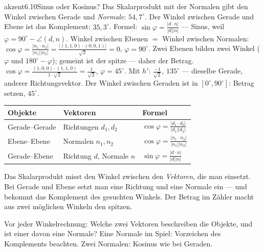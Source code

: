 \begin{loesungkarte}{akzent}{6.10}{Sinus oder Kosinus?}
Das Skalarprodukt mit der Normalen gibt den Winkel zwischen Gerade und \emph{Normale}: $54{,}7^{\circ}$. Der Winkel zwischen Gerade und Ebene ist das Komplement: $35{,}3^{\circ}$. Formel: $\sin\varphi = \frac{|d\cdot n|}{|d||n|}$ --- Sinus, weil $\varphi = 90^{\circ} - \angle(d, n)$.
Winkel zwischen Ebenen $=$ Winkel zwischen Normalen: $\cos\varphi = \frac{|n_1\cdot n_2|}{|n_1||n_2|} = \frac{|(1, 1, 0)\cdot(0, 0, 1)|}{\sqrt2} = 0$, $\varphi = 90^{\circ}$. Zwei Ebenen bilden zwei Winkel ($\varphi$ und $180^{\circ} - \varphi$); gemeint ist der spitze --- daher der Betrag.
$\cos\varphi = \frac{(1, 0, 0)\cdot(1, 1, 0)}{1\cdot\sqrt2} = \frac1{\sqrt2}$, $\varphi = 45^{\circ}$. Mit $h'$: $\frac{-1}{\sqrt2}$, $135^{\circ}$ --- dieselbe Gerade, anderer Richtungsvektor. Der Winkel zwischen Geraden ist in $[0^{\circ}, 90^{\circ}]$: Betrag setzen, $45^{\circ}$.
\begin{center}\small
\begin{tabular}{l|l|l}
Objekte & Vektoren & Formel\\ \hline
Gerade--Gerade & Richtungen $d_1, d_2$ & $\cos\varphi = \frac{|d_1\cdot d_2|}{|d_1||d_2|}$\\
Ebene--Ebene & Normalen $n_1, n_2$ & $\cos\varphi = \frac{|n_1\cdot n_2|}{|n_1||n_2|}$\\
Gerade--Ebene & Richtung $d$, Normale $n$ & $\sin\varphi = \frac{|d\cdot n|}{|d||n|}$
\end{tabular}
\end{center}
\begin{fehler}\kastentext
Das Skalarprodukt misst den Winkel zwischen den \emph{Vektoren}, die man einsetzt. Bei Gerade und Ebene setzt man eine Richtung und eine Normale ein --- und bekommt das Komplement des gesuchten Winkels. Der Betrag im Zähler macht aus zwei möglichen Winkeln den spitzen.
\end{fehler}
\begin{mitnehmen}\kastentext
Vor jeder Winkelrechnung: Welche zwei Vektoren beschreiben die Objekte, und ist einer davon eine Normale? Eine Normale im Spiel: Vorzeichen des Komplements beachten. Zwei Normalen: Kosinus wie bei Geraden.
\end{mitnehmen}
\end{loesungkarte}


